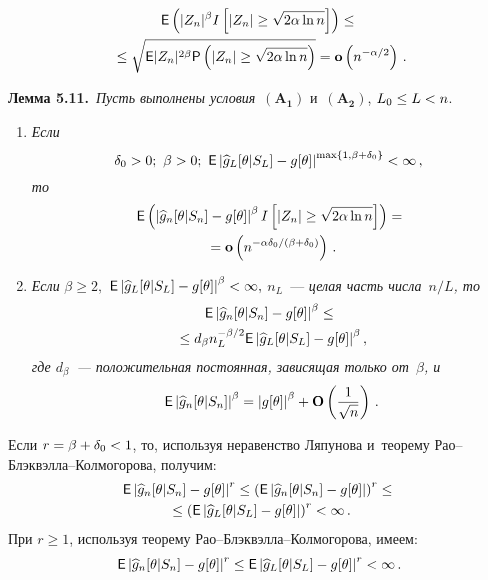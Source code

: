 \begin{multicols}{2}
 \noindent
 \begin{multline*}
  {\sf E} \left( |Z_n|^\beta I\left[|Z_n|\ge \sqrt{2\alpha\ln n}\right]\right)
 \le{}\\
 {}\le
 \sqrt{{\sf E} |Z_n|^{2\beta}
  {\sf P}\left(|Z_n|\ge \sqrt{2\alpha\ln n}\right)}=
 \mathbf{o}\left(n^{-\alpha/2}\right)\,.
 \end{multline*}
 
 \vspace*{-2pt}


\noindent
\textbf{Лемма 5.11.}\
\textit{Пусть выполнены условия}~$\mathbf{(A_1)}$ и~$\mathbf{(A_2)}$, $L_0\hm\le L \hm<n$.
\begin{enumerate}[1.]
\item
\textit{Если} 
$$
\hspace*{-4pt}\delta_0>0;\ \beta>0;\
{\sf E} \left|\widehat{g}_L[\theta|S_L]-g[\theta] \right|^{\max\{1,\beta+\delta_0\}}
 <\infty\,,
 $$
  \textit{то}
 \begin{multline}
 {\sf E} \left(\left|\widehat{g}_n[\theta|S_n]-g[\theta] \right|^{\beta}
 I\left[|Z_n|\ge \sqrt{2\alpha\ln n}\right]\right)={}\\
 {}=
 \mathbf{o}\left(n^{-\alpha\delta_0/(\beta+\delta_0)}\right)\,.
 \label{L:5.11-1}
 \end{multline}
 \item \textit{Если} $\beta\ge 2,$
 $\Ep \left|\widehat{g}_L[\theta|S_L]\hm-g[\theta] \right|^\beta\hm<\infty,$
 $n_L$~--- \textit{целая часть числа~$n/L$, то}
  \begin{multline}
 {\sf E} \left|\widehat{g}_n[\theta|S_n]-g[\theta] \right|^{\beta}
 \le{}\\
 {}\le
 d_\beta n_L^{-\beta/2}
 {\sf E} \left|\widehat{g}_L[\theta|S_L]-g[\theta] \right|^{\beta},
 \label{L:5.11-2}
 \end{multline}
 \textit{где $d_\beta$~--- положительная постоянная, зависящая только от~$\beta$, и}
  \begin{equation}
 {\sf E} \left|\widehat{g}_n[\theta|S_n]\right|^{\beta}
 =\left|g[\theta]\right|^{\beta}+
 {\bf O}\left(\displaystyle\frac{\displaystyle 1\mathstrut}{\displaystyle \sqrt{n}\mathstrut} \right)\,.
 \label{L:5.11-3}
 \end{equation}
 \end{enumerate}

 \Do
 Если $r\hm=\beta\hm+\delta_0\hm<1$, то, используя неравенство Ляпунова
 и~тео\-ре\-му Рао--Блэк\-вэл\-ла--Кол\-мо\-го\-ро\-ва, получим:
  \begin{multline*}
{\sf E} \left|\widehat{g}_n[\theta|S_n]-g[\theta] \right|^{r}\le
 \left({\sf E} \left|\widehat{g}_n[\theta|S_n]-g[\theta] \right|\right)^{r}\le{}\\
 {}\le
 \left({\sf E} \left|\widehat{g}_L[\theta|S_L]-g[\theta]
  \right|\right)^{r}<\infty\,.
 \end{multline*}
 При $r\ge 1$, используя теорему Рао--Блэк\-вэл\-ла--Кол\-мо\-го\-ро\-ва, имеем:
  \begin{equation*}
{\sf E} \left|\widehat{g}_n[\theta|S_n]-g[\theta] \right|^{r}\le
 {\sf E} \left|\widehat{g}_L[\theta|S_L]-g[\theta] \right|^{r}<\infty\,.
 \end{equation*}


\end{multicols}
